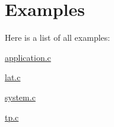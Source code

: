 \section{Examples}
Here is a list of all examples:\begin{CompactItemize}
\item 
\hyperlink{application_8c-example}{application.c}
\item 
\hyperlink{lat_8c-example}{lat.c}
\item 
\hyperlink{system_8c-example}{system.c}
\item 
\hyperlink{tp_8c-example}{tp.c}
\end{CompactItemize}
